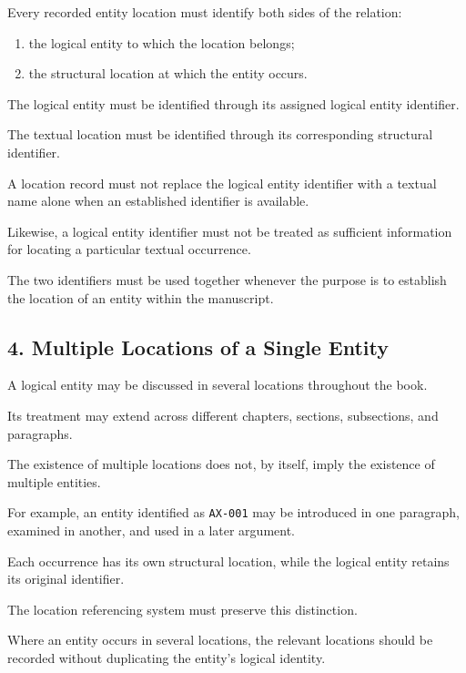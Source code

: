 Every recorded entity location must
identify both sides of the relation:

\begin{enumerate}
    \item the logical entity to which
    the location belongs;
    \item the structural location at
    which the entity occurs.
\end{enumerate}

The logical entity must be identified
through its assigned logical entity
identifier.

The textual location must be identified
through its corresponding structural
identifier.

A location record must not replace
the logical entity identifier with
a textual name alone when an established
identifier is available.

Likewise, a logical entity identifier
must not be treated as sufficient
information for locating a particular
textual occurrence.

The two identifiers must be used
together whenever the purpose is
to establish the location of an
entity within the manuscript.


\subsection*{4. Multiple Locations of a Single Entity}

A logical entity may be discussed
in several locations throughout
the book.

Its treatment may extend across
different chapters, sections,
subsections, and paragraphs.

The existence of multiple locations
does not, by itself, imply the
existence of multiple entities.

For example, an entity identified
as \texttt{AX-001} may be introduced
in one paragraph, examined in
another, and used in a later
argument.

Each occurrence has its own
structural location, while the
logical entity retains its original
identifier.

The location referencing system
must preserve this distinction.

Where an entity occurs in several
locations, the relevant locations
should be recorded without
duplicating the entity's logical
identity.

